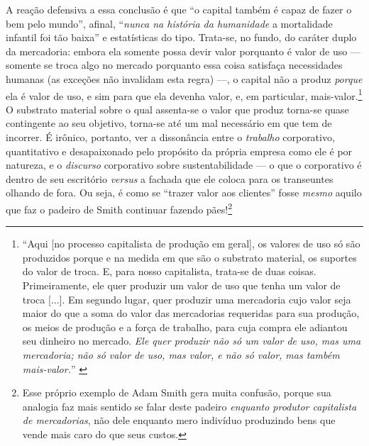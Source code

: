 \documentclass[12pt]{article}
\begin{document}
A reação defensiva a essa conclusão é que ``o capital também é capaz de fazer o bem pelo mundo'', afinal, ``\textit{nunca na história da humanidade} a mortalidade infantil foi tão baixa'' e estatísticas do tipo. Trata-se, no fundo, do caráter duplo da mercadoria: embora ela somente possa devir valor porquanto é valor de uso --- somente se troca algo no mercado porquanto essa coisa satisfaça necessidades humanas (as exceções não invalidam esta regra) ---, o capital não a produz \textit{porque} ela é valor de uso, e sim para que ela devenha valor, e, em particular, mais-valor.\footnote{``Aqui {[}no processo capitalista de produção em geral{]}, os
valores de uso só são produzidos porque e na medida em que são o substrato material, os
suportes do valor de troca. E, para nosso capitalista,
trata-se de duas coisas. Primeiramente, ele quer produzir um valor de
uso que tenha um valor de troca [...]. Em segundo lugar,
quer produzir uma mercadoria cujo valor seja
maior do que a soma do valor das mercadorias requeridas para sua produção,
os meios de produção e a força de trabalho, para cuja compra ele
adiantou seu dinheiro no mercado. \textit{Ele quer produzir não só um valor de uso, mas uma mercadoria; não só valor de uso, mas valor, e não só valor, mas também
mais-valor.}''  \cite[p.~263; grifo meu]{Marx2017}} O substrato material sobre o qual assenta-se o valor que produz torna-se quase contingente ao seu objetivo, torna-se até um mal necessário em que tem de incorrer. É irônico, portanto, ver a dissonância entre o \textit{trabalho} corporativo, quantitativo e desapaixonado pelo propósito da própria empresa como ele é por natureza, e o \textit{discurso} corporativo sobre sustentabilidade --- o que o corporativo é dentro de seu escritório \textit{versus} a fachada que ele coloca para os transeuntes olhando de fora. Ou seja, é como se ``trazer valor aos clientes'' fosse \textit{mesmo} aquilo que faz o padeiro de Smith continuar fazendo pães!\footnote{Esse próprio exemplo de Adam Smith gera muita confusão, porque sua analogia faz mais sentido se falar deste padeiro \textit{enquanto produtor capitalista de mercadorias}, não dele enquanto mero indivíduo produzindo bens que vende mais caro do que seus custos.}
\end{document}
